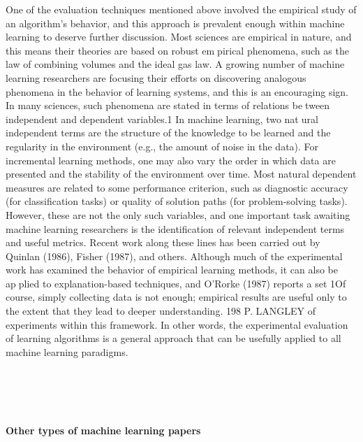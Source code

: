 \documentclass{article}
\begin{document}
One of the evaluation techniques mentioned above involved the empirical
study of an algorithm's behavior, and this approach is prevalent enough
within machine learning to deserve further discussion. Most sciences are
empirical in nature, and this means their theories are based on robust empirical phenomena, such as the law of combining volumes and the ideal gas
law. A growing number of machine learning researchers are focusing their
efforts on discovering analogous phenomena in the behavior of learning
systems, and this is an encouraging sign.
In many sciences, such phenomena are stated in terms of relations between independent and dependent variables.1
 In machine learning, two natural independent terms are the structure of the knowledge to be learned and
the regularity in the environment (e.g., the amount of noise in the data).
For incremental learning methods, one may also vary the order in which
data are presented and the stability of the environment over time. Most
natural dependent measures are related to some performance criterion,
such as diagnostic accuracy (for classification tasks) or quality of solution
paths (for problem-solving tasks). However, these are not the only such
variables, and one important task awaiting machine learning researchers is
the identification of relevant independent terms and useful metrics.
Recent work along these lines has been carried out by Quinlan (1986),
Fisher (1987), and others. Although much of the experimental work has
examined the behavior of empirical learning methods, it can also be applied to explanation-based techniques, and O'Rorke (1987) reports a set
1Of course, simply collecting data is not enough; empirical results are useful only to
the extent that they lead to deeper understanding.
198 P. LANGLEY
of experiments within this framework. In other words, the experimental
evaluation of learning algorithms is a general approach that can be usefully
applied to all machine learning paradigms.\\\\\\\\\

\begin{small}
\textbf{Other types of machine learning papers}
\end{small}\\\\
\end{document}
